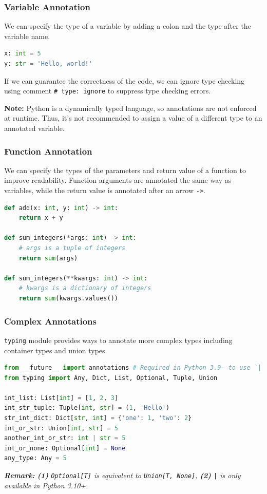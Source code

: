 \documentclass[beamer, en, version=2.0]{huangfusl-template}
\begin{document}
    \begin{frame}[fragile]
        \frametitle{Variable Annotation}

        We can specify the type of a variable by adding a colon and the type after the variable name.

\begin{lstlisting}[language=python]
x: int = 5
y: str = 'Hello, world!'
\end{lstlisting}

        If we can guarantee the correctness of the code, we can ignore type checking using comment {\footnotesize\verb|# type: ignore|} to suppress type checking errors.

        \textbf{Note:} Python is a dynamically typed language, so annotations are not enforced at runtime. Thus, it's not recommended to assign a value of a different type to an annotated variable.
    \end{frame}
    \begin{frame}[fragile]
        \frametitle{Function Annotation}

        We can specify the types of the parameters and return value of a function to improve readability. Function arguments are annotated the same way as variables, while the return value is annotated after an arrow {\footnotesize\verb|->|}.

\begin{lstlisting}[language=python]
def add(x: int, y: int) -> int:
    return x + y

def sum_integers(*args: int) -> int:
    # args is a tuple of integers
    return sum(args)

def sum_integers(**kwargs: int) -> int:
    # kwargs is a dictionary of integers
    return sum(kwargs.values())
\end{lstlisting}

    \end{frame}
    \begin{frame}[fragile]
        \frametitle{Complex Annotations}

        {\footnotesize\verb|typing|} module provides ways to annotate more complex types including container types and union types.

\begin{lstlisting}[language=python]
from __future__ import annotations # Required in Python 3.9- to use `|`
from typing import Any, Dict, List, Optional, Tuple, Union

int_list: List[int] = [1, 2, 3]
int_str_tuple: Tuple[int, str] = (1, 'Hello')
str_int_dict: Dict[str, int] = {'one': 1, 'two': 2}
int_or_str: Union[int, str] = 5
another_int_or_str: int | str = 5
int_or_none: Optional[int] = None
any_type: Any = 5
\end{lstlisting}

        {\footnotesize\itshape\textbf{Remark:} \textbf{(1)} {\scriptsize\verb|Optional[T]|} is equivalent to {\scriptsize\verb|Union[T, None]|}, \textbf{(2)} {\scriptsize\texttt{|}} is only available in Python 3.10+.}
    \end{frame}
\end{document}
